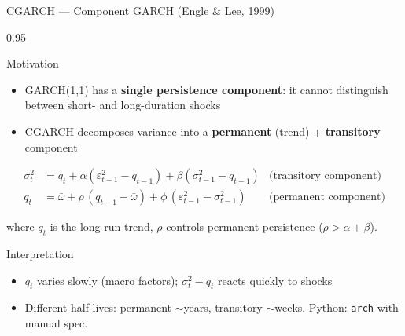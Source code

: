 \documentclass[9pt, aspectratio=169, t]{beamer}
\begin{document}
\begin{frame}{CGARCH --- Component GARCH (Engle \& Lee, 1999)}
    \begin{cminipage}{0.95\textwidth}
    {\footnotesize
        \begin{block}{Motivation}
            \begin{itemize}\setlength{\itemsep}{0pt}
                \item GARCH(1,1) has a \textbf{single persistence component}: it cannot distinguish between short- and long-duration shocks
                \item CGARCH decomposes variance into a \textbf{permanent} (trend) + \textbf{transitory} component
            \end{itemize}
        \end{block}
        \vspace{-1mm}
        \begin{defn}[CGARCH(1,1)]
            \vspace{-2mm}
            \begin{align*}
                \sigma_t^2 &= q_t + \alpha(\varepsilon_{t-1}^2 - q_{t-1}) + \beta(\sigma_{t-1}^2 - q_{t-1}) & \text{(transitory component)}\\
                q_t &= \bar{\omega} + \rho\,(q_{t-1} - \bar{\omega}) + \phi\,(\varepsilon_{t-1}^2 - \sigma_{t-1}^2) & \text{(permanent component)}
            \end{align*}
            \vspace{-2mm}

            where $q_t$ is the long-run trend, $\rho$ controls permanent persistence ($\rho > \alpha+\beta$).
        \end{defn}
        \vspace{-1mm}
        \begin{alertblock}{Interpretation}
            \begin{itemize}\setlength{\itemsep}{0pt}
                \item $q_t$ varies slowly (macro factors); $\sigma_t^2 - q_t$ reacts quickly to shocks
                \item Different half-lives: permanent $\sim$years, transitory $\sim$weeks. Python: \texttt{arch} with manual spec.
            \end{itemize}
        \end{alertblock}
    }
    \end{cminipage}
\end{frame}
\end{document}
